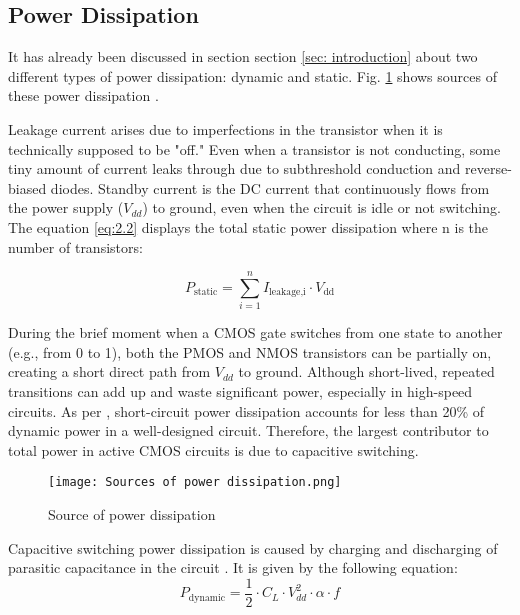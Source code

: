 \documentclass[conference]{IEEEtran}
\begin{document}
\subsection{Power Dissipation}
\label{subsec: power}
It has already been discussed in section section \ref{sec: introduction} about two different types of power dissipation: dynamic and static. Fig. \ref{fig:source of power dissipation} shows 
sources of these power dissipation \cite{Saraju01}. 

Leakage current arises due to imperfections in the transistor when it is technically supposed to be "off." Even when a transistor is not conducting, some tiny amount of current leaks through due to subthreshold conduction and reverse-biased diodes. Standby current is the DC current that continuously flows from the power supply ($V_{dd}$) to ground, even when the circuit is idle or not switching. The equation \ref{eq:2.2} displays the total static power dissipation where n is the number of transistors:

\begin{equation}
\label{eq:2.2}
P_{\text{static}} = \sum_{i=1}^{n} I_{\text{leakage,i}} \cdot V_{\text{dd}}
\end{equation}

During the brief moment when a CMOS gate switches from one state to another (e.g., from 0 to 1), both the PMOS and NMOS transistors can be partially on, creating a short direct path from $V_{dd}$ to ground. Although short-lived, repeated transitions can add up and waste significant power, especially in high-speed circuits. As per \cite{1052168}, short-circuit power dissipation accounts for less than 20\% of dynamic power in a well-designed circuit. Therefore, the largest contributor to total power in active CMOS circuits is due to capacitive switching.

\begin{figure}[h!]
    \centering
    \texttt{[image: Sources of power dissipation.png]}
    \caption{Source of power dissipation}
    \label{fig:source of power dissipation}
\end{figure}

Capacitive switching power dissipation is caused by charging and discharging of parasitic capacitance in the circuit \cite{Saraju01}. It is given by the following equation:
\begin{equation}
P_{\text{dynamic}} = \frac{1}{2} \cdot C_L \cdot V_{dd}^2 \cdot \alpha \cdot f
\label{eq: powereq}
\end{equation}
\end{document}
